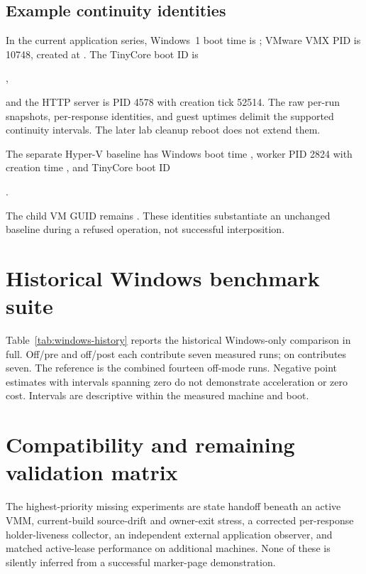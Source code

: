 \subsection{Example continuity identities}
In the current application series, Windows~1 boot time is
; VMware VMX PID is 10748, created at
. The TinyCore boot ID is
\begin{center}\small{},\end{center}
and the HTTP server is PID 4578 with creation tick 52514. The raw per-run
snapshots, per-response identities, and guest uptimes delimit the supported
continuity intervals. The later lab cleanup reboot does not extend them.

The separate Hyper-V baseline has Windows boot time
, worker PID 2824 with creation time
, and TinyCore boot ID
\begin{center}\small{}.\end{center}
The child VM GUID remains
. These identities substantiate an
unchanged baseline during a refused operation, not successful interposition.

\section{Historical Windows benchmark suite}
\label{app:historical}
Table~\ref{tab:windows-history} reports the historical Windows-only comparison
in full. Off/pre and off/post each contribute seven measured runs; on contributes
seven. The reference is the combined fourteen off-mode runs. Negative point
estimates with intervals spanning zero do not demonstrate acceleration or zero
cost. Intervals are descriptive within the measured machine and boot.

\begin{table}[htbp]
\centering\small
\caption{Historical Windows overhead. These values belong to the historical
driver/boot and are not pooled with the current same-binary experiment.}
\label{tab:windows-history}

\end{table}

\newpage
\section{Compatibility and remaining validation matrix}
\label{app:matrix}
The highest-priority missing experiments are state handoff beneath an active
VMM, current-build source-drift and owner-exit stress, a corrected per-response
holder-liveness collector, an independent external application observer, and
matched active-lease performance on additional machines. None of these is
silently inferred from a successful marker-page demonstration.

